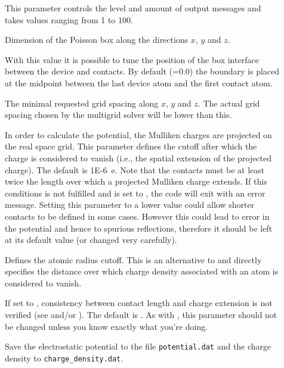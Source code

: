 \begin{description}
\item[] This parameter controls the level and amount of output
  messages and takes values ranging from 1 to 100.
\item[] Dimension of the Poisson box
  along the directions $x$, $y$ and $z$.
\item[] With this value it is possible
  to tune the position of the box interface between the device and contacts.  By
  default (=0.0) the boundary is placed at the midpoint between
  the last device atom and the first contact atom.
\item[] The minimal requested grid
  spacing along $x$, $y$ and $z$. The actual grid spacing chosen by the
  multigrid solver will be lower than this.
\item[] In order to calculate the potential, the
  Mulliken charges are projected on the real space grid. This parameter defines
  the cutoff after which the charge is considered to vanish (i.e., the spatial
  extension of the projected charge). The default is 1E-6~e. Note that the
  contacts must be at least twice the length over which a projected Mulliken
  charge extends. If this conditions is not fulfilled and  is
  set to , the code will exit with an error message. Setting this
  parameter to a lower value could allow shorter contacts to be defined in some
  cases. However this could lead to error in the potential and hence to spurious
  reflections, therefore it should be left at its default value (or changed very
  carefully).
\item[] Defines the atomic radius
  cutoff. This is an alternative to  and directly
  specifies the distance over which charge density associated with an atom is
  considered to vanish.
\item[] If set to , consistency between contact length
  and charge extension is not verified (see  and/or
  ). The default is . As with
  , this parameter should not be changed unless you
  know exactly what you're doing.
\item[] Save the electrostatic potential to the file
  \verb|potential.dat| and the charge density to \verb|charge_density.dat|.

\end{description}
